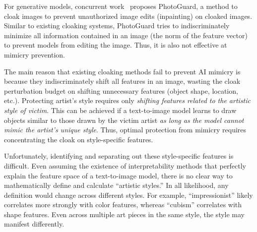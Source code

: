 For generative models, concurrent work~\cite{madry-defense}
proposes PhotoGuard, a method to cloak images to prevent
unauthorized image edits (inpainting) on cloaked images. Similar to existing
cloaking systems, PhotoGuard tries to indiscriminately minimize all
information contained in an image (\ie the norm of the feature vector) to
prevent models from editing the image. Thus, it is also not effective at
mimicry prevention.  


 The main reason that existing cloaking methods
fail to prevent AI mimicry is because they indiscriminately shift all
features in an image, wasting the cloak perturbation budget on shifting
unnecessary features (\eg object shape, location, etc.). Protecting artist's
style requires only {\em shifting features related to the artistic style of
  victim}. This can be achieved if a text-to-image model learns to draw objects
similar to those drawn by the victim artist {\em as long as the model cannot
  mimic the artist's unique style}. Thus, optimal protection from mimicry requires
concentrating the cloak on style-specific features.  

Unfortunately, identifying and separating out these style-specific features
is difficult. Even assuming the existence of interpretability methods that
perfectly explain the feature space of a text-to-image model, there is no
clear way to mathematically define and calculate ``artistic styles.'' In all
likelihood, any definition would change across different styles. For example,
``impressionist'' likely correlates more strongly with color features,
whereas ``cubism'' correlates with shape features. Even across multiple
art pieces in the same style, the style may manifest differently.  
